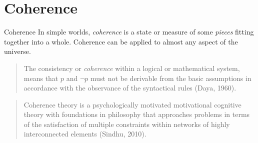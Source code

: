 \section{Coherence}

\begin{frame}
  \begin{block}{Coherence}
    In simple worlds, \emph{coherence} is a state or measure of some \emph{pieces}
    fitting together into a whole. Coherence can be applied to almost any aspect of
    the universe.
  \end{block}
  \begin{quote}
    The consistency or \emph{coherence} within a logical or mathematical
    system, means that $p$ and $\neg p$ must not be derivable from the
    basic assumptions in accordance with the observance of the syntactical
    rules (Daya, 1960).
  \end{quote}
  \begin{quote}
    Coherence theory is a psychologically motivated motivational cognitive theory with
    foundations in philosophy that approaches problems in terms of the satisfaction
    of multiple constraints within networks of highly interconnected elements
    (Sindhu, 2010).
  \end{quote}
\end{frame}


